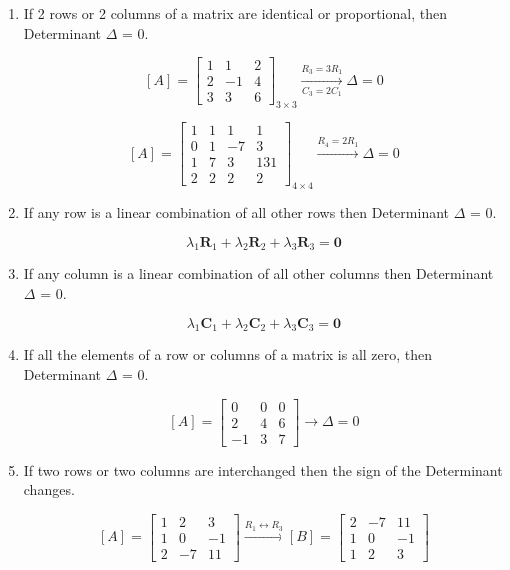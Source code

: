 \begin{enumerate}
    \item If 2 rows or 2 columns of a matrix are identical or proportional, then Determinant $\Delta$ = 0.

    $$  [A] = \begin{bmatrix}
        1 & 1 & 2 \\
        2 & -1 & 4 \\
        3 & 3 & 6
        \end{bmatrix}_{3 \times 3}
        \xrightarrow[C_3 = 2C_1]{R_3 = 3R_1} \Delta = 0
    $$

    $$  [A] = \begin{bmatrix}
        1 & 1 & 1 & 1 \\
        0 & 1 & -7 & 3 \\
        1 & 7 & 3 & 131 \\
        2 & 2 & 2 & 2
        \end{bmatrix}_{4 \times 4}
        \xrightarrow{R_4 = 2R_1} \Delta = 0
    $$

    \item If any row is a linear combination of all other rows then Determinant $\Delta$ = 0.

    $$ \lambda_{1}\mathbf{R}_{1} + \lambda_{2}\mathbf{R}_{2} + \lambda_{3}\mathbf{R}_{3} = \mathbf{0} $$

    \item If any column is a linear combination of all other columns then Determinant $\Delta$ = 0.

    $$ \lambda_{1}\mathbf{C}_{1} + \lambda_{2}\mathbf{C}_{2} + \lambda_{3}\mathbf{C}_{3} = \mathbf{0} $$

    \item If all the elements of a row or columns of a matrix is all zero, then Determinant $\Delta$ = 0.

    $$  [A] = \begin{bmatrix}
        0 & 0 & 0 \\
        2 & 4 & 6 \\
        -1 & 3 & 7
        \end{bmatrix} \longrightarrow \Delta = 0
    $$

    \item If two rows or two columns are interchanged then the sign of the Determinant changes.

    $$  [A] = \begin{bmatrix}
        1 & 2 & 3 \\
        1 & 0 & -1 \\
        2 & -7 & 11
        \end{bmatrix} \xrightarrow{R_1 \leftrightarrow R_3}
        [B] = \begin{bmatrix}
        2 & -7 & 11 \\
        1 & 0 & -1 \\
        1 & 2 & 3
        \end{bmatrix}
    $$


\end{enumerate}
